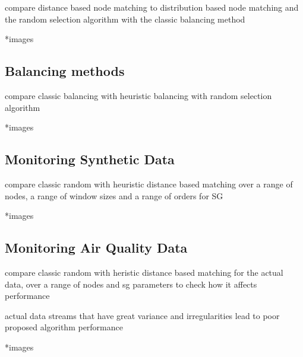 compare distance based node matching to distribution based node matching and the random selection algorithm with the classic balancing method

*images

\subsection{Balancing methods}

compare classic balancing with heuristic balancing with random selection algorithm

*images

\subsection{Monitoring Synthetic Data}

compare classic random with heuristic distance based matching over a range of nodes, a range of window sizes and a range of orders for SG

*images

\subsection{Monitoring Air Quality Data}

compare classic random with heristic distance based matching for the actual data, over a range of nodes and sg parameters to check how it affects performance

actual data streams that have great variance and irregularities lead to poor proposed algorithm performance

*images
